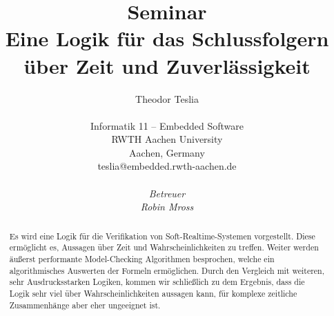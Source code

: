 \documentclass{lni}
\author{
	Theodor Teslia \\ 
	\\ 
	Informatik 11 -- Embedded Software \\ 
	RWTH Aachen University \\ 
	Aachen, Germany \\ 
	teslia@embedded.rwth-aachen.de\\
	\\
	\textit{Betreuer}\\
	\textit{Robin Mross}\\ %
}
\title{\small{Seminar} \\ \vspace{0.5cm} \Large{Eine Logik für das Schlussfolgern über Zeit und Zuverlässigkeit}}
\theoremstyle{def_style}
\theoremstyle{break}
\begin{document}
\maketitle

\begin{abstract}
	Es wird eine Logik für die Verifikation von Soft-Realtime-Systemen vorgestellt.
	Diese ermöglicht es, Aussagen über Zeit und Wahrscheinlichkeiten zu treffen.
	Weiter werden äußerst performante Model-Checking Algorithmen besprochen, welche ein algorithmisches Auswerten der Formeln ermöglichen.
	Durch den Vergleich mit weiteren, sehr Ausdrucksstarken Logiken, kommen wir schließlich zu dem Ergebnis, dass die Logik sehr viel über Wahrscheinlichkeiten aussagen kann, für komplexe zeitliche Zusammenhänge aber eher ungeeignet ist.
\end{abstract}














\end{document}
